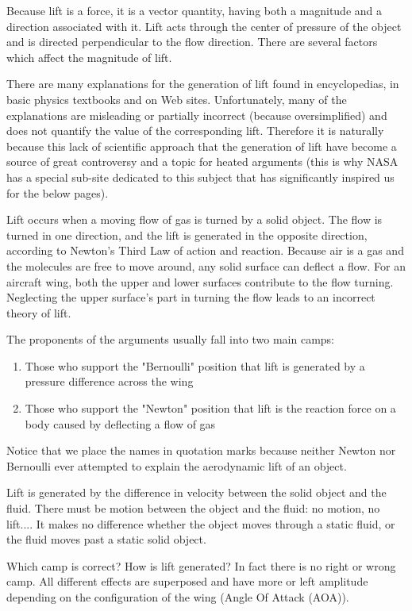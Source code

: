	Because lift is a force, it is a vector quantity, having both a magnitude and a direction associated with it. Lift acts through the center of pressure of the object and is directed perpendicular to the flow direction. There are several factors which affect the magnitude of lift.
	
	There are many explanations for the generation of lift found in encyclopedias, in basic physics textbooks and on Web sites. Unfortunately, many of the explanations are misleading or partially incorrect (because oversimplified) and does not quantify the value of the corresponding lift. Therefore it is naturally because this lack of scientific approach that the generation of lift have become a source of great controversy and a topic for heated arguments (this is why NASA has a special sub-site dedicated to this subject that has significantly inspired us for the below pages).

	Lift occurs when a moving flow of gas is turned by a solid object. The flow is turned in one direction, and the lift is generated in the opposite direction, according to Newton's Third Law of action and reaction. Because air is a gas and the molecules are free to move around, any solid surface can deflect a flow. For an aircraft wing, both the upper and lower surfaces contribute to the flow turning. Neglecting the upper surface's part in turning the flow leads to an incorrect theory of lift.
	
	The proponents of the arguments usually fall into two main camps: 
	\begin{enumerate}
		\item Those who support the "Bernoulli" position that lift is generated by a pressure difference across the wing

		\item Those who support the "Newton" position that lift is the reaction force on a body caused by deflecting a flow of gas
	\end{enumerate}
	Notice that we place the names in quotation marks because neither Newton nor Bernoulli ever attempted to explain the aerodynamic lift of an object. 
	
	Lift is generated by the difference in velocity between the solid object and the fluid. There must be motion between the object and the fluid: no motion, no lift.... It makes no difference whether the object moves through a static fluid, or the fluid moves past a static solid object. 
	
	Which camp is correct? How is lift generated? In fact there is no right or wrong camp. All different effects are superposed and have more or left amplitude depending on the configuration of the wing (Angle Of Attack (AOA)).


